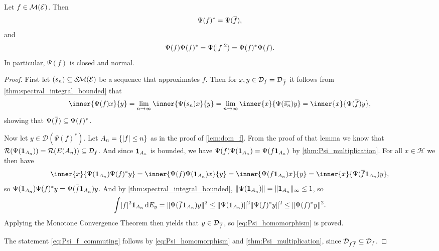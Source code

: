 \documentclass[article, a4paper, 11pt, oneside]{memoir}
\makeatletter
\numberwithin{equation}{chapter}
\newcommand{\calH}{\mathcal{H}}
\newcommand{\calE}{\mathcal{E}}
\newcommand{\dom}{\mathcal{D}}
\newcommand{\range}{\mathcal{R}}
\theoremstyle{myexample}
\theoremstyle{myexample}
\theoremstyle{myexamplebreak}
\theoremstyle{myexamplebreak}
\theoremstyle{nonumberplain}
\newtheorem{proof}{\protect\@proof}
\theoremstyle{MyNonumberplain}
\newcommand{\@proof}{}
\renewcommand{\@proof}{Proof}%
\renewcommand{\@proof}{Bevis}%
\makeatother
\begin{document}
\begin{theorem}
    \label{thm:Psi_homomorphism}
    Let $f \in \measurable(\calE)$. Then
    \begin{equation}
        \label{eq:Psi_homomorphism}
        \Psi(f)^* = \Psi(\conj{f}),
    \end{equation}
    and
    \begin{equation}
        \label{eq:Psi_f_commuting}
        \Psi(f) \Psi(f)^* = \Psi(\lvert f\rvert^2) = \Psi(f)^* \Psi(f).
    \end{equation}
    In particular, $\Psi(f)$ is closed and normal.
\end{theorem}

\begin{proof}
    First let $(s_n) \subseteq \simplemeas(\calE)$ be a sequence that approximates $f$. Then for $x, y \in \dom_f = \dom_{\conj f}$ it follows from \cref{thm:spectral_integral_bounded} that
    \begin{equation*}
        \inner{\Psi(f)x}{y}
            = \lim_{n \to \infty} \inner{\Psi(s_n)x}{y}
            = \lim_{n \to \infty} \inner{x}{\Psi(\conj{s_n})y}
            = \inner{x}{\Psi(\conj{f})y},
    \end{equation*}
    showing that $\Psi(\conj{f}) \subseteq \Psi(f)^*$.
    
    Now let $y \in \dom(\Psi(f)^*)$. Let $A_n = \{ \lvert f\rvert \leq n \}$ as in the proof of \cref{lem:dom_f}. From the proof of that lemma we know that $\range(\Psi(\indicator{A_n})) = \range(E(A_n)) \subseteq \dom_f$. And since $\mathbf{1}_{A_n}$ is bounded, we have $\Psi(f) \Psi(\mathbf{1}_{A_n}) = \Psi(f \mathbf{1}_{A_n})$ by \cref{thm:Psi_multiplication}. For all $x \in \calH$ we then have
    \begin{equation*}
        \inner{x}{ \Psi(\indicator{A_n}) \Psi(f)^* y }
            = \inner{\Psi(f) \Psi(\indicator{A_n}) x}{y}
            = \inner{\Psi(f \indicator{A_n})x}{y}
            = \inner{x}{\Psi(\conj{f} \indicator{A_n}) y},
    \end{equation*}
    so $\Psi(\indicator{A_n}) \Psi(f)^* y = \Psi(\conj{f} \indicator{A_n}) y$. And by \cref{thm:spectral_integral_bounded}, $\lVert\Psi(\mathbf{1}_{A_n})\rVert = \lVert\mathbf{1}_{A_n}\rVert_\infty \leq 1$, so
    \begin{equation*}
        \int \abs{f}^2 \indicator{A_n} \dif E_y
            = \norm{\Psi(\conj{f} \indicator{A_n})y}^2
            \leq \norm{\Psi(\indicator{A_n})}^2 \norm{\Psi(f)^* y}^2
            \leq \norm{\Psi(f)^* y}^2.
    \end{equation*}
    Applying the Monotone Convergence Theorem then yields that $y \in \dom_{\conj f}$, so \eqref{eq:Psi_homomorphism} is proved.
    
    The statement \eqref{eq:Psi_f_commuting} follows by \eqref{eq:Psi_homomorphism} and \cref{thm:Psi_multiplication}, since $\dom_{f \conj f} \subseteq \dom_f$.
\end{proof}
\end{document}
